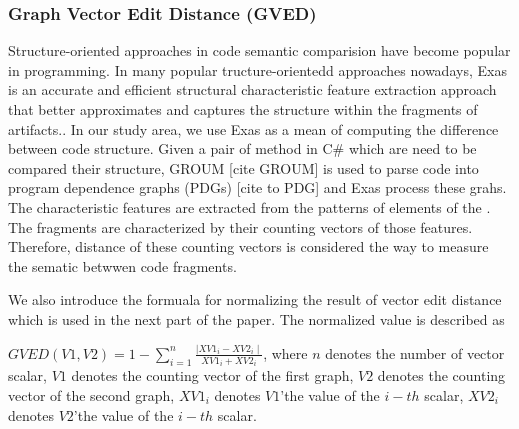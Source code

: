 \subsubsection{\textbf{Graph Vector Edit Distance (GVED)}} 
Structure-oriented approaches in code semantic comparision have become popular in programming. In many popular tructure-orientedd approaches nowadays, Exas is an accurate and efficient structural characteristic feature extraction approach that better approximates and captures the structure within the fragments of artifacts.\cite{Accurate and Efficient Structural Characteristic Feature Extraction for Clone Detection}.
In our study area, we use Exas as a mean of computing the difference between code structure. Given a pair of method in C\# which are need to be compared their structure, GROUM [cite GROUM] is used to parse code into program dependence graphs (PDGs) [cite to PDG] and Exas process these grahs.  The characteristic features are extracted from the patterns of elements of the . The fragments are characterized by their counting vectors of those features. Therefore, distance of these counting vectors is considered the way to measure the sematic betwwen code fragments.

We also introduce the formuala for normalizing the result of vector edit distance which is used in the next part of the paper. The normalized value is described as

$GVED(V1, V2) = 1 - \sum_{i=1}^{n} \frac{ \mid XV1_i - XV2_i \mid}{XV1_i + XV2_i}$, 
where $n$ denotes the number of vector scalar, $V1$ denotes the counting vector of the first graph, $V2$ denotes the counting vector of the second graph, $XV1_i$ denotes $V1$\rq the value of the $i-th$ scalar, $XV2_i$ denotes $V2$\rq the value of the $i-th$ scalar.  